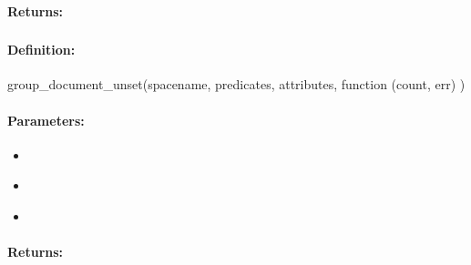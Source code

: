 \paragraph{Returns:}


\pagebreak
\subsubsection{}
\label{api:nodejs:group_document_unset}


\paragraph{Definition:}
\begin{javascriptcode}
group_document_unset(spacename, predicates, attributes, function (count, err) {})
\end{javascriptcode}
\paragraph{Parameters:}
\begin{itemize}[noitemsep]
\item {}\\

\item {}\\

\item {}\\

\end{itemize}

\paragraph{Returns:}


\pagebreak
\subsubsection{}
\label{api:nodejs:document_unset}


